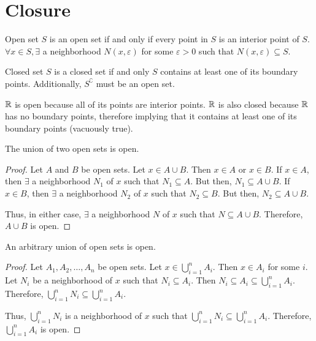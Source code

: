 \section{Closure}
\begin{definition}{Open set}{}
    $S$ is an open set if and only if every point in $S$ is an interior point of $S$. $\forall x \in S, \exists$ a neighborhood $N(x, \varepsilon)$ for some $\varepsilon > 0$ such that $N(x, \varepsilon) \subseteq S$.
\end{definition}

\begin{definition}{Closed set}{}
    $S$ is a closed set if and only $S$ contains at least one of its boundary points. Additionally, $S^\complement$ must be an open set.
\end{definition}

\begin{note}
    $\mathbb{R}$ is open because all of its points are interior points. $\mathbb{R}$ is also closed because $\mathbb{R}$ has no boundary points, therefore implying that it contains at least one of its boundary points (vacuously true).
\end{note}

\begin{theorem}{}{}
    The union of two open sets is open.
\end{theorem}
\begin{proof}
    Let $A$ and $B$ be open sets. Let $x \in A \cup B$. Then $x \in A$ or $x \in B$. If $x \in A$, then $\exists$ a neighborhood $N_1$ of $x$ such that $N_1 \subseteq A$. But then, $N_1 \subseteq A \cup B$. If $x \in B$, then $\exists$ a neighborhood $N_2$ of $x$ such that $N_2 \subseteq B$. But then, $N_2 \subseteq A \cup B$. 
    
    Thus, in either case, $\exists$ a neighborhood $N$ of $x$ such that $N \subseteq A \cup B$. Therefore, $A \cup B$ is open.
\end{proof}

\begin{theorem}{}{}
    An arbitrary union of open sets is open.
\end{theorem}
\begin{proof}
    Let $A_1, A_2, \ldots, A_n$ be open sets. Let $x \in \bigcup_{i=1}^n A_i$. Then $x \in A_i$ for some $i$. Let $N_i$ be a neighborhood of $x$ such that $N_i \subseteq A_i$. Then $N_i \subseteq A_i \subseteq \bigcup_{i=1}^n A_i$. Therefore, $\bigcup_{i=1}^n N_i \subseteq \bigcup_{i=1}^n A_i$. 
    
    Thus, $\bigcup_{i=1}^n N_i$ is a neighborhood of $x$ such that $\bigcup_{i=1}^n N_i \subseteq \bigcup_{i=1}^n A_i$. Therefore, $\bigcup_{i=1}^n A_i$ is open.
\end{proof}

